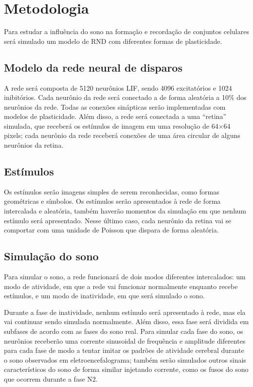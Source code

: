 \chapter{Metodologia}

Para estudar a influência do sono na formação e recordação de conjuntos celulares será simulado um modelo de RND com diferentes
formas de plasticidade.

\section{Modelo da rede neural de disparos}

A rede será composta de 5120 neurônios LIF, sendo 4096 excitatórios e 1024 inibitórios. Cada neurônio da rede será conectado a de
forma aleatória a 10\% dos neurônios da rede. Todas as conexões sinápticas serão implementadas com modelos de plasticidade. Além
disso, a rede será conectada a uma ``retina'' simulada, que receberá os estímulos de imagem em uma resolução de 64$\times$64
pixels; cada neurônio da rede receberá conexões de uma área circular de alguns neurônios da retina.

\section{Estímulos}

Os estímulos serão imagens simples de serem reconhecidas, como formas geométricas e símbolos. Os estímulos serão apresentados à
rede de forma intercalada e aleatória, também haverão momentos da simulação em que nenhum estímulo será apresentado. Nesse último
caso, cada neurônio da retina vai se comportar com uma unidade de Poisson que dispara de forma aleatória.

\section{Simulação do sono}

Para simular o sono, a rede funcionará de dois modos diferentes intercalados: um modo de atividade, em que a rede vai funcionar
normalmente enquanto recebe estímulos, e um modo de inatividade, em que será simulado o sono. 

Durante a fase de inatividade, nenhum estímulo será apresentado à rede, mas ela vai continuar sendo simulada normalmente. Além
disso, essa fase será dividida em subfases de acordo com as fases do sono real. Para simular cada fase do sono, os neurônios
receberão uma corrente sinusoidal de frequência e amplitude diferentes para cada fase de modo a tentar imitar os padrões de
atividade cerebral durante o sono observados em eletroencefalograma; também serão simulados outros sinais característicos do sono
de forma similar injetando corrente, como os fusos do sono que ocorrem durante a fase N2.

